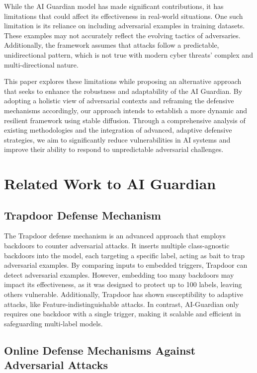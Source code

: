 \documentclass[letterpaper,twocolumn,10pt]{article}
\begin{document}
While the AI Guardian model has made significant contributions, it has limitations that could affect its effectiveness in real-world situations. One such limitation is its reliance on including adversarial examples in training datasets. These examples may not accurately reflect the evolving tactics of adversaries. Additionally, the framework assumes that attacks follow a predictable, unidirectional pattern, which is not true with modern cyber threats' complex and multi-directional nature.

This paper explores these limitations while proposing an alternative approach that seeks to enhance the robustness and adaptability of the AI Guardian. By adopting a holistic view of adversarial contexts and reframing the defensive mechanisms accordingly, our approach intends to establish a more dynamic and resilient framework using stable diffusion. Through a comprehensive analysis of existing methodologies and the integration of advanced, adaptive defensive strategies, we aim to significantly reduce vulnerabilities in AI systems and improve their ability to respond to unpredictable adversarial challenges.

\section{Related Work to AI Guardian}
\subsection{Trapdoor Defense Mechanism} 

The Trapdoor defense mechanism is an advanced approach that employs backdoors to counter adversarial attacks. It inserts multiple class-agnostic backdoors into the model, each targeting a specific label, acting as bait to trap adversarial examples. By comparing inputs to embedded triggers, Trapdoor can detect adversarial examples. However, embedding too many backdoors may impact its effectiveness, as it was designed to protect up to 100 labels, leaving others vulnerable. Additionally, Trapdoor has shown susceptibility to adaptive attacks, like Feature-indistinguishable attacks. In contrast, AI-Guardian only requires one backdoor with a single trigger, making it scalable and efficient in safeguarding multi-label models.

\subsection{Online Defense Mechanisms Against Adversarial Attacks}
\end{document}
